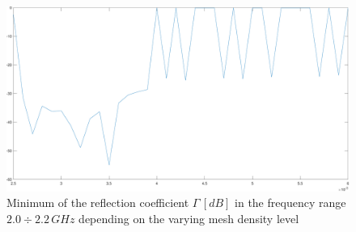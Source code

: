 \documentclass[12pt,a4paper]{article}
\begin{document}
{\begin{multicols}{2}
\begin{figure}[h]
\begin{center}

		\includegraphics[scale=0.3]{mesh_first_test.pdf}
		\caption{{Minimum of the reflection coefficient $\Gamma\, [dB]$ in the frequency range $2.0\div 2.2\,GHz$ depending on the varying mesh density level}}
		\label{fig:first mesh test}
\end{center}
	\end{figure}
\end{multicols}
\begin{figure}[h]
	\begin{center}
		

\end{center}
\end{figure}}
\end{document}
